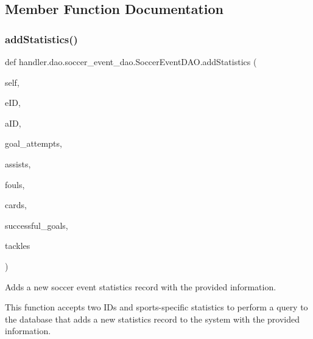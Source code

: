 \subsection{Member Function Documentation}
\mbox{\label{classhandler_1_1dao_1_1soccer__event__dao_1_1_soccer_event_d_a_o_a77bff928a92d95d753d7a96f8d5d2253}} 
\subsubsection{\texorpdfstring{add\+Statistics()}{addStatistics()}}
{\footnotesize\ttfamily def handler.\+dao.\+soccer\+\_\+event\+\_\+dao.\+Soccer\+Event\+D\+A\+O.\+add\+Statistics (\begin{DoxyParamCaption}\item[{}]{self,  }\item[{}]{e\+ID,  }\item[{}]{a\+ID,  }\item[{}]{goal\+\_\+attempts,  }\item[{}]{assists,  }\item[{}]{fouls,  }\item[{}]{cards,  }\item[{}]{successful\+\_\+goals,  }\item[{}]{tackles }\end{DoxyParamCaption})}



Adds a new soccer event statistics record with the provided information. 

This function accepts two I\+Ds and sports-\/specific statistics to perform a query to the database that adds a new statistics record to the system with the provided information.


